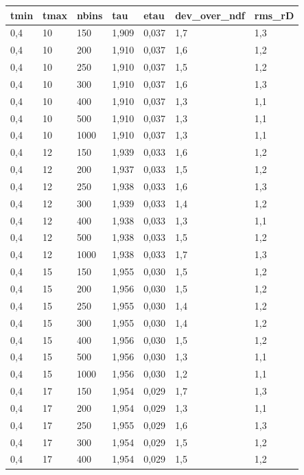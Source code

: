     \begin{tabular}{lllllll}
    \hline
        tmin & tmax & nbins & tau & etau & dev\_over\_ndf & rms\_rD \\ \hline
        0,4 & 10 & 150 & 1,909 & 0,037 & 1,7 & 1,3 \\ 
        0,4 & 10 & 200 & 1,910 & 0,037 & 1,6 & 1,2 \\ 
        0,4 & 10 & 250 & 1,910 & 0,037 & 1,5 & 1,2 \\ 
        0,4 & 10 & 300 & 1,910 & 0,037 & 1,6 & 1,3 \\ 
        0,4 & 10 & 400 & 1,910 & 0,037 & 1,3 & 1,1 \\ 
        0,4 & 10 & 500 & 1,910 & 0,037 & 1,3 & 1,1 \\ 
        0,4 & 10 & 1000 & 1,910 & 0,037 & 1,3 & 1,1 \\ 
        0,4 & 12 & 150 & 1,939 & 0,033 & 1,6 & 1,2 \\ 
        0,4 & 12 & 200 & 1,937 & 0,033 & 1,5 & 1,2 \\ 
        0,4 & 12 & 250 & 1,938 & 0,033 & 1,6 & 1,3 \\ 
        0,4 & 12 & 300 & 1,939 & 0,033 & 1,4 & 1,2 \\ 
        0,4 & 12 & 400 & 1,938 & 0,033 & 1,3 & 1,1 \\ 
        0,4 & 12 & 500 & 1,938 & 0,033 & 1,5 & 1,2 \\ 
        0,4 & 12 & 1000 & 1,938 & 0,033 & 1,7 & 1,3 \\ 
        0,4 & 15 & 150 & 1,955 & 0,030 & 1,5 & 1,2 \\ 
        0,4 & 15 & 200 & 1,956 & 0,030 & 1,5 & 1,2 \\ 
        0,4 & 15 & 250 & 1,955 & 0,030 & 1,4 & 1,2 \\ 
        0,4 & 15 & 300 & 1,955 & 0,030 & 1,4 & 1,2 \\ 
        0,4 & 15 & 400 & 1,956 & 0,030 & 1,5 & 1,2 \\ 
        0,4 & 15 & 500 & 1,956 & 0,030 & 1,3 & 1,1 \\ 
        0,4 & 15 & 1000 & 1,956 & 0,030 & 1,2 & 1,1 \\ 
        0,4 & 17 & 150 & 1,954 & 0,029 & 1,7 & 1,3 \\ 
        0,4 & 17 & 200 & 1,954 & 0,029 & 1,3 & 1,1 \\ 
        0,4 & 17 & 250 & 1,955 & 0,029 & 1,6 & 1,3 \\ 
        0,4 & 17 & 300 & 1,954 & 0,029 & 1,5 & 1,2 \\ 
        0,4 & 17 & 400 & 1,954 & 0,029 & 1,5 & 1,2 \\ 

\end{tabular}
